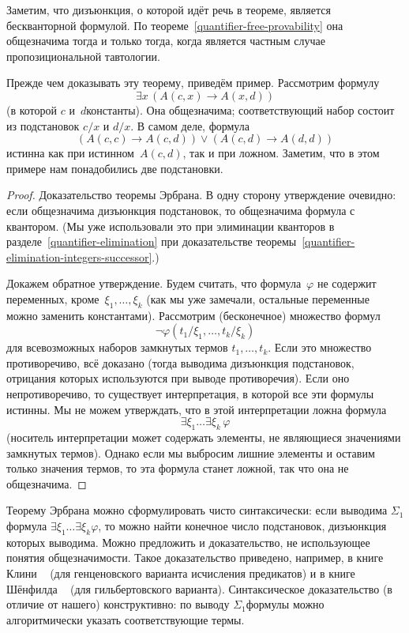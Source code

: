 Заметим, что дизъюнкция, о которой идёт речь в теореме, является
бескванторной формулой. По
теореме~\ref{quantifier-free-provability} она общезначима тогда
и только тогда, когда является частным случае пропозициональной
тавтологии.

Прежде чем доказывать эту теорему, приведём пример. Рассмотрим
формулу
        $$
\exists x \,( A(c,x)\to A(x,d) )
        $$
(в которой $c$ и~$d$\т константы). Она общезначима; соответствующий
набор состоит из подстановок $c/x$ и $d/x$. В самом деле, формула
        $$
(A(c,c)\to A(c,d))\lor (A(c,d)\to A(d,d))
        $$
истинна как при истинном~$A(c,d)$, так и при ложном.
Заметим, что в этом примере нам понадобились две подстановки.

\begin{proof}
Доказательство теоремы Эрбрана. В одну сторону утверждение
очевидно: если общезначима дизъюнкция подстановок, то
общезначима формула с квантором. (Мы уже использовали это
при элиминации кванторов в
разделе~\ref{quantifier-elimination} при доказательстве
теоремы~\ref{quantifier-elimination-integers-successor}.)

Докажем обратное утверждение. Будем считать, что
формула~$\varphi$ не содержит переменных,
кроме~$\xi_1,\dots,\xi_k$ (как мы уже замечали, остальные
переменные можно заменить константами). Рассмотрим (бесконечное)
множество формул
        $$
\lnot\varphi(t_1/\xi_1,\dots,t_k/\xi_k)
        $$
для всевозможных наборов замкнутых термов $t_1,\dots,t_k$. Если
это множество противоречиво, всё доказано (тогда выводима
дизъюнкция подстановок, отрицания которых
используются при выводе противоречия).
Если оно
непротиворечиво, то существует интерпретация, в которой все эти
формулы истинны. Мы не можем утверждать, что в этой интерпретации
ложна формула
        $$
\exists\xi_1\dots\exists\xi_k\,\varphi
        $$
(носитель интерпретации может содержать элементы, не являющиеся
значениями замкнутых термов). Однако если мы выбросим лишние
элементы и оставим только значения термов, то эта формула
станет ложной, так что она не общезначима.
\end{proof}

Теорему Эрбрана можно сформулировать чисто
синтаксически: если выводима $\Sigma_1$\д формула $\exists
\xi_1\ldots\exists \xi_k \varphi$, то можно найти конечное число
подстановок, дизъюнкция которых выводима. Можно предложить и
доказательство, не использующее понятия
общезначимости. Такое
доказательство приведено, например, в книге
Клини%
%
~\cite{kleene-logic} (для генценовского%
варианта исчисления предикатов) и в книге Шёнфилда%
~\cite{shoenfield} (для
гильбертовского варианта). Синтаксическое доказательство (в
отличие от нашего) конструктивно: по выводу $\Sigma_1$\д формулы
можно алгоритмически указать соответствующие термы.

